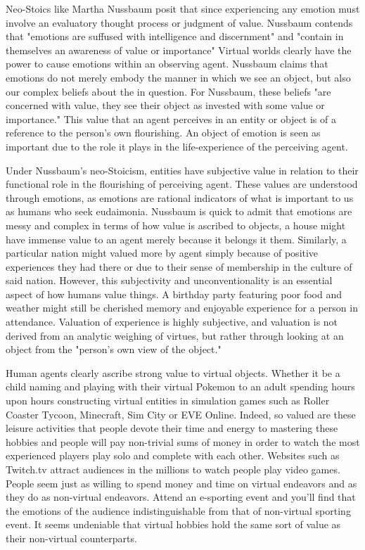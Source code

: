  Neo-Stoics like Martha Nussbaum posit that since experiencing any emotion must involve an evaluatory thought process or judgment of value. 
 Nussbaum contends that "emotions are suffused with intelligence and discernment" \cite{nussbaum2001upheavals} and "contain in themselves an awareness of value or importance" \cite{nussbaum2001upheavals} Virtual worlds clearly have the power to cause emotions within an observing agent. Nussbaum claims that emotions do not merely embody the manner in which we see an object, but also our complex beliefs about the in question. For Nussbaum, these beliefs "are concerned with value, they see their object as invested with some value or importance." \cite{nussbaum2001upheavals} This value that an agent perceives in an entity or object is of a reference to the person's own flourishing. An object of emotion is seen as important due to the role it plays in the life-experience of the perceiving agent. 
 
 Under Nussbaum's neo-Stoicism, entities have subjective value in relation to their functional role in the flourishing of perceiving agent. These values are understood through emotions, as emotions are rational indicators of what is important to us as humans who seek eudaimonia. Nussbaum is quick to admit that emotions are messy and complex in terms of how value is ascribed to objects, a house might have immense value to an agent merely because it belongs it them. Similarly, a particular nation might valued more by agent simply because of positive experiences they had there or due to their sense of membership in the culture of said nation. However, this subjectivity and unconventionality is an essential aspect of how humans value things. A birthday party featuring poor food and weather might still be cherished memory and enjoyable experience for a person in attendance. Valuation of experience is highly subjective, and valuation is not derived from an analytic weighing of virtues, but rather through looking at an object from the "person's own view of the object." \cite{nussbaum2001upheavals}
 
Human agents clearly ascribe strong value to virtual objects. Whether it be a child naming and playing with their virtual Pokemon to an adult spending hours upon hours constructing virtual entities in simulation games such as Roller Coaster Tycoon, Minecraft, Sim City or EVE Online. Indeed, so valued are these leisure activities that people devote their time and energy to mastering these hobbies and people will pay non-trivial sums of money in order to watch the most experienced players play solo and complete with each other. Websites such as Twitch.tv attract audiences in the millions to watch people play video games. People seem just as willing to spend money and time on virtual endeavors and  as they do as non-virtual endeavors. Attend an e-sporting event and you'll find that the emotions of the audience indistinguishable from that of non-virtual sporting event. It seems undeniable that virtual hobbies hold the same sort of value as their non-virtual counterparts. 

